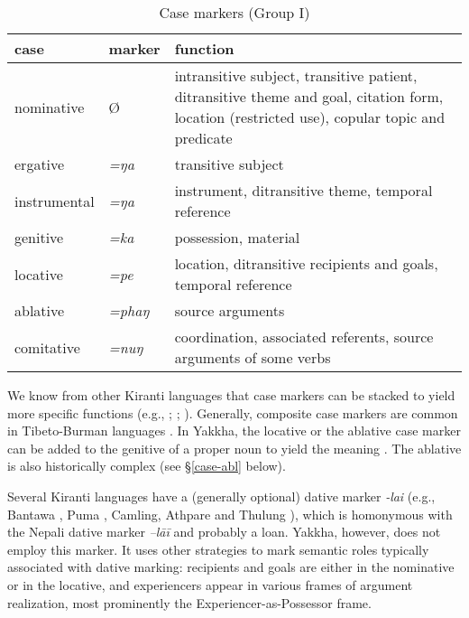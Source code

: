 \begin{table}[htp]
\begin{centering}
\begin{tabular}{llp{8cm}}
\toprule
{\sc case}&{\sc marker}&{\sc function}\\
\midrule
nominative& Ø&intransitive subject, transitive patient, ditransitive theme and goal, citation form, location (restricted use), copular topic and predicate\\
ergative&\emph{=ŋa}&transitive subject\\
instrumental&\emph{=ŋa}&instrument, ditransitive theme, temporal reference\\
genitive&\emph{=ka} &possession, material\\
locative&\emph{=pe} &location, ditransitive recipients and  goals, temporal reference\\
ablative&\emph{=phaŋ} &source arguments\\
comitative&\emph{=nuŋ} &coordination, associated referents, source arguments of some verbs\\
\bottomrule
\end{tabular} 
\caption{Case markers (Group I)}\label{case-markers}
\end{centering}
\end{table}


We know from other Kiranti languages that case markers can be stacked to yield more specific functions (e.g., \citet[81]{Ebert1994The-structure}; \citet[6]{Dirksmeyer2008Spatial}; \citet[26]{Schikowski2013_Thesis}). Generally, composite case markers are common in Tibeto-Burman languages \citep[60]{DeLancey1985_Etymological}. In Yakkha, the locative or the ablative case marker can be added to the genitive of a proper noun to yield the meaning . The ablative is also historically complex (see §\ref{case-abl} below).

Several Kiranti languages have a (generally optional) dative marker \emph{-lai} (e.g., Bantawa \citep{Doornenbal2009A-grammar}, Puma \citep{Bickeletal2007Two-ways}, Camling, Athpare and Thulung \citep{Ebert1994The-structure}), which is homonymous with the Nepali dative marker \emph{–lāī} and probably a loan. Yakkha, however, does not employ this marker. It uses other strategies to mark semantic roles typically associated with  dative marking: recipients and goals are either in the nominative or in the locative, and experiencers appear in various frames of argument realization, most prominently the Experiencer-as-Possessor frame.

